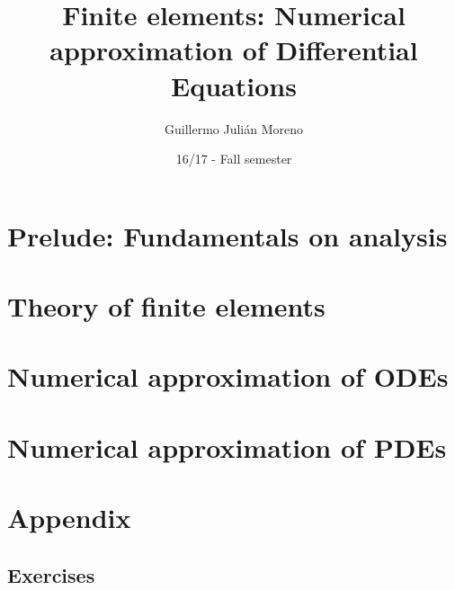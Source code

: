 \documentclass[palatino,twoside]{epflnotes}
\title{Finite elements: Numerical approximation of Differential Equations}
\author{Guillermo Julián Moreno}
\date{16/17 - Fall semester}
\begin{document}
\frontmatter
\pagestyle{plain}
\maketitle

\tableofcontents
\mainmatter

\part{Prelude: Fundamentals on analysis}


\part{Theory of finite elements}


\part{Numerical approximation of ODEs}


\part{Numerical approximation of PDEs}


\appendix
\part{Appendix}

\chapter{Exercises}


\backmatter


\printindex
\end{document}
